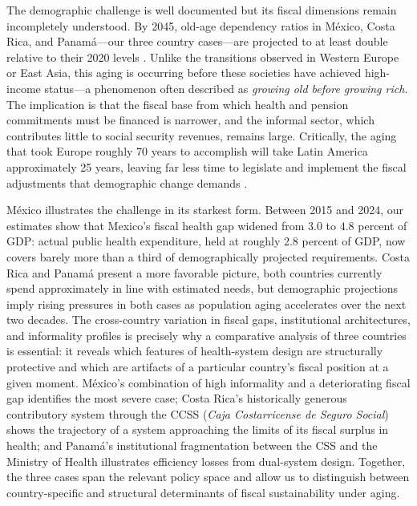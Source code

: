\documentclass[12pt,a4paper]{article}
\begin{document}
The demographic challenge is well documented but its fiscal dimensions remain incompletely understood. By 2045, old-age dependency ratios in M\'exico, Costa Rica, and Panam\'a---our three country cases---are projected to at least double relative to their 2020 levels \citep{ECLAC2022}. Unlike the transitions observed in Western Europe or East Asia, this aging is occurring before these societies have achieved high-income status---a phenomenon often described as \textit{growing old before growing rich}. The implication is that the fiscal base from which health and pension commitments must be financed is narrower, and the informal sector, which contributes little to social security revenues, remains large. Critically, the aging that took Europe roughly 70 years to accomplish will take Latin America approximately 25 years, leaving far less time to legislate and implement the fiscal adjustments that demographic change demands \citep{WorldBankInformalizing2025}.

M\'exico illustrates the challenge in its starkest form. Between 2015 and 2024, our estimates show that Mexico's fiscal health gap widened from 3.0 to 4.8 percent of GDP: actual public health expenditure, held at roughly 2.8 percent of GDP, now covers barely more than a third of demographically projected requirements. Costa Rica and Panam\'a present a more favorable picture, both countries currently spend approximately in line with estimated needs, but demographic projections imply rising pressures in both cases as population aging accelerates over the next two decades. The cross-country variation in fiscal gaps, institutional architectures, and informality profiles is precisely why a comparative analysis of three countries is essential: it reveals which features of health-system design are structurally protective and which are artifacts of a particular country's fiscal position at a given moment. M\'exico's combination of high informality and a deteriorating fiscal gap identifies the most severe case; Costa Rica's historically generous contributory system through the CCSS (\textit{Caja Costarricense de Seguro Social}) shows the trajectory of a system approaching the limits of its fiscal surplus in health; and Panam\'a's institutional fragmentation between the CSS and the Ministry of Health illustrates efficiency losses from dual-system design. Together, the three cases span the relevant policy space and allow us to distinguish between country-specific and structural determinants of fiscal sustainability under aging.
\end{document}
